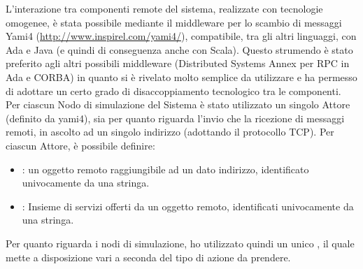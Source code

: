 L'interazione tra componenti remote del sistema, realizzate con tecnologie omogenee, è stata possibile mediante il middleware per lo scambio di messaggi Yami4 (\url{http://www.inspirel.com/yami4/}), compatibile, tra gli altri linguaggi, con Ada e Java (e quindi di conseguenza anche con Scala). Questo strumendo è stato preferito agli altri possibili middleware (Distributed Systems Annex per RPC in Ada e CORBA) in quanto si è rivelato molto semplice da utilizzare e ha permesso di adottare un certo grado di disaccoppiamento tecnologico tra le componenti. Per ciascun Nodo di simulazione del Sistema è stato utilizzato un singolo Attore (definito da yami4), sia per quanto riguarda l'invio che la ricezione di messaggi remoti, in ascolto ad un singolo indirizzo (adottando il protocollo TCP). Per ciascun Attore, è possibile definire:
	\begin{itemize}
		\item {}: un oggetto remoto raggiungibile ad un dato indirizzo, identificato univocamente da una stringa.
		\item {}: Insieme di servizi offerti da un oggetto remoto, identificati univocamente da una stringa.
	\end{itemize}
Per quanto riguarda i nodi di simulazione, ho utilizzato quindi un unico , il quale mette a disposizione vari  a seconda del tipo di azione da prendere.



